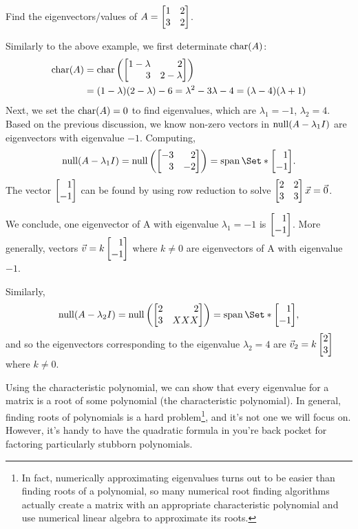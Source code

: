 \begin{example}
	Find the eigenvectors/values of $A=\mat{1&2\\3&2}$.

	Similarly to the above example, we first determinate $\operatorname{char}(A)$:
	\begin{align*}
	    \Char(A)&=\Char\left(\mat{1-\lambda&2\\3&2-\lambda}\right)\\
	            &=(1-\lambda)(2-\lambda)-6=\lambda^2-3\lambda-4=(\lambda-4)(\lambda+1)
	\end{align*}
	Next, we set the $\operatorname{char}(A)=0$ to find eigenvalues, which are $\lambda_1=-1$, $\lambda_2=4$. Based on the previous discussion, we know non-zero vectors in $\operatorname{null}(A-\lambda_1I)$ are eigenvectors with eigenvalue $-1$. Computing, 
	\[
	\Null(A-\lambda_1I) = \Null\left(\mat{-3&2\\3&-2}\right)=
	\Span\Set*{\mat{1\\-1}}.
	\]
	The vector $\mat{1\\-1}$ can be found by using row reduction to solve $\mat{2&2\\3&3}\vec x=\vec 0$.
	
	We conclude, one eigenvector of A with eigenvalue $\lambda_1=-1$ is $\mat{1\\-1}$. More generally, vectors $\vec v = k \mat{1\\-1}$ where $k \neq 0$ are eigenvectors of A with eigenvalue $-1$. 
	
	Similarly,
	\[
	\Null(A-\lambda_2I) = \Null\left(\mat{2&2\\3&XXX}\right)=
	\Span\Set*{\mat{1\\-1}},
	\]
	and so the eigenvectors corresponding to the eigenvalue $\lambda_2=4$ are $\vec v_2 = k\mat{2\\3}$ where $k \neq 0$.
	
\end{example}

Using the characteristic polynomial, we can show that every eigenvalue
for a matrix is a root of some polynomial (the characteristic polynomial).
In general, finding roots of polynomials is a hard problem\footnote{ In fact,
numerically approximating eigenvalues turns out to be easier than finding roots
of a polynomial, so many numerical root finding algorithms actually create a matrix
with an appropriate characteristic polynomial and use numerical linear
algebra to approximate its roots.}, and it's not one we will focus on. However, it's
handy to have the quadratic formula in you're back pocket for factoring particularly
stubborn polynomials.

